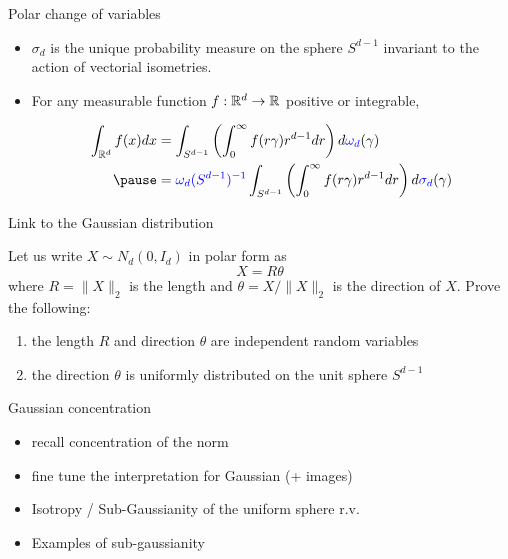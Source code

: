 \documentclass[handout]{beamer} %
\begin{document}
  \begin{frame}{Polar change of variables}
    \begin{theorem}
      \begin{itemize}
      \item $\sigma_{d}$ is the unique probability measure on the sphere
        $S^{d-1}$ invariant to the action of vectorial isometries.

        \pause

      \item For any measurable function $f: \mathbb{R}^{d} \to \mathbb{R}$ positive or integrable,

        \begin{equation*}
          \begin{aligned}
            \int_{\R^{d}} f(x) d x &=\int_{S^{d-1}}\left(\int_{0}^{\infty} f(r \gamma) r^{d-1} d r\right) d \textcolor{blue}{\omega_d}(\gamma) \\ \pause
            &= \textcolor{blue}{\omega_d(S^{d-1})^{-1}} \int_{S^{d-1}}\left(\int_{0}^{\infty} f(r \gamma) r^{d-1} d r\right) d \textcolor{blue}{\sigma_d}(\gamma)
          \end{aligned}
        \end{equation*}


      \end{itemize}

    \end{theorem}

  \end{frame}

  \begin{frame}{Link to the Gaussian distribution}
    \begin{proposition}[Exercise 3.3.7] Let us write $X \sim N_d\left(0, I_{d}\right)$ in
      polar  form as
      $$
      X=R \theta
      $$
      where $R=\|X\|_{2}$ is the length and $\theta=X /\|X\|_{2}$ is the direction
      of $X$. Prove the following:

      \pause

      \begin{enumerate}
      \item the length $R$ and direction $\theta$ are independent random
        variables
        \pause
      \item the direction $\theta$ is uniformly distributed on the unit sphere
        $S^{d-1}$
      \end{enumerate}
    \end{proposition}

  \end{frame}

  \begin{frame}{Gaussian concentration}
    \begin{itemize}
    \item recall concentration of the norm
    \item fine tune the interpretation for Gaussian (+ images)
    \item Isotropy / Sub-Gaussianity of the uniform sphere r.v.
    \item Examples of sub-gaussianity
    \end{itemize}
  \end{frame}
\end{document}
